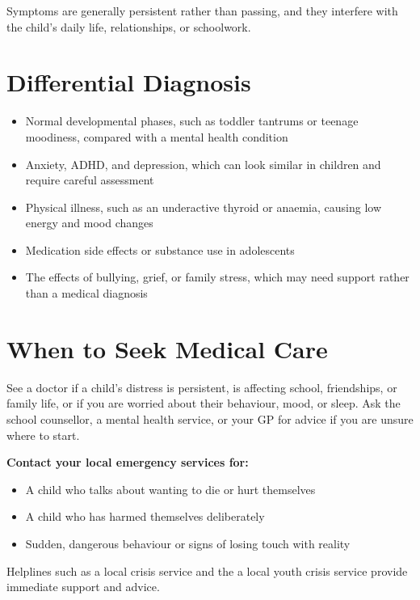 Symptoms are generally persistent rather than passing, and they interfere with the child's daily life, relationships, or schoolwork.

\section*{Differential Diagnosis}
\begin{itemize}
    \item Normal developmental phases, such as toddler tantrums or teenage moodiness, compared with a mental health condition
    \item Anxiety, ADHD, and depression, which can look similar in children and require careful assessment
    \item Physical illness, such as an underactive thyroid or anaemia, causing low energy and mood changes
    \item Medication side effects or substance use in adolescents
    \item The effects of bullying, grief, or family stress, which may need support rather than a medical diagnosis
\end{itemize}

\section*{When to Seek Medical Care}
See a doctor if a child's distress is persistent, is affecting school, friendships, or family life, or if you are worried about their behaviour, mood, or sleep. Ask the school counsellor, a mental health service, or your GP for advice if you are unsure where to start.

\textbf{Contact your local emergency services for:}
\begin{itemize}
    \item A child who talks about wanting to die or hurt themselves
    \item A child who has harmed themselves deliberately
    \item Sudden, dangerous behaviour or signs of losing touch with reality
\end{itemize}

Helplines such as a local crisis service and the a local youth crisis service provide immediate support and advice.

